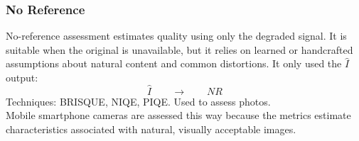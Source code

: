 \subsubsection{No Reference}
No-reference assessment estimates quality using only the degraded signal. It is suitable when the original is unavailable, but it relies on learned or handcrafted assumptions about natural content and common distortions.
It only used the $\hat{I}$ output:
$$\boxed{\hat{I}} \qquad \longrightarrow \qquad \boxed{NR}$$
Techniques: BRISQUE, NIQE, PIQE. Used to assess photos.\\
Mobile smartphone cameras are assessed this way because the metrics estimate characteristics associated with natural, visually acceptable images.
